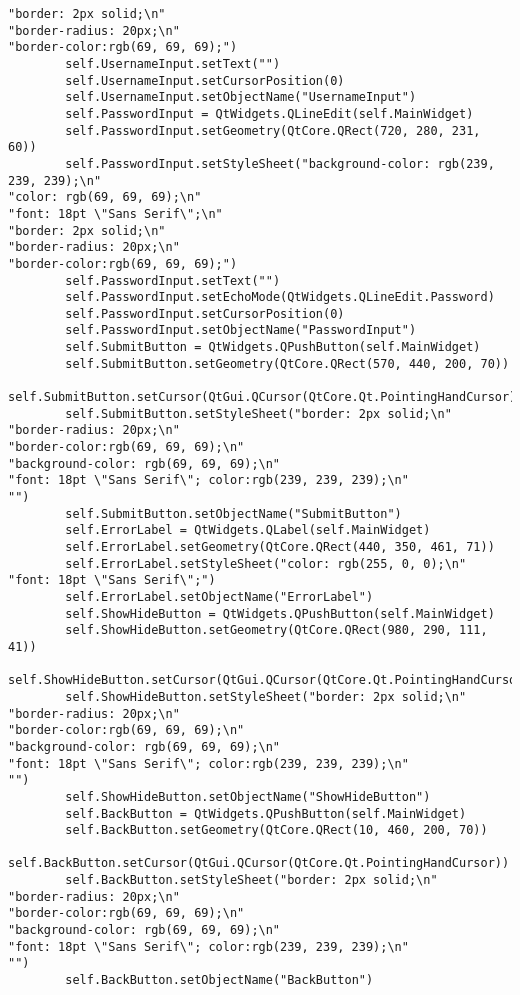\documentclass{article}
\begin{document}
\begin{lstlisting}
"border: 2px solid;\n"
"border-radius: 20px;\n"
"border-color:rgb(69, 69, 69);")
        self.UsernameInput.setText("")
        self.UsernameInput.setCursorPosition(0)
        self.UsernameInput.setObjectName("UsernameInput")
        self.PasswordInput = QtWidgets.QLineEdit(self.MainWidget)
        self.PasswordInput.setGeometry(QtCore.QRect(720, 280, 231, 60))
        self.PasswordInput.setStyleSheet("background-color: rgb(239, 239, 239);\n"
"color: rgb(69, 69, 69);\n"
"font: 18pt \"Sans Serif\";\n"
"border: 2px solid;\n"
"border-radius: 20px;\n"
"border-color:rgb(69, 69, 69);")
        self.PasswordInput.setText("")
        self.PasswordInput.setEchoMode(QtWidgets.QLineEdit.Password)
        self.PasswordInput.setCursorPosition(0)
        self.PasswordInput.setObjectName("PasswordInput")
        self.SubmitButton = QtWidgets.QPushButton(self.MainWidget)
        self.SubmitButton.setGeometry(QtCore.QRect(570, 440, 200, 70))
        self.SubmitButton.setCursor(QtGui.QCursor(QtCore.Qt.PointingHandCursor))
        self.SubmitButton.setStyleSheet("border: 2px solid;\n"
"border-radius: 20px;\n"
"border-color:rgb(69, 69, 69);\n"
"background-color: rgb(69, 69, 69);\n"
"font: 18pt \"Sans Serif\"; color:rgb(239, 239, 239);\n"
"")
        self.SubmitButton.setObjectName("SubmitButton")
        self.ErrorLabel = QtWidgets.QLabel(self.MainWidget)
        self.ErrorLabel.setGeometry(QtCore.QRect(440, 350, 461, 71))
        self.ErrorLabel.setStyleSheet("color: rgb(255, 0, 0);\n"
"font: 18pt \"Sans Serif\";")
        self.ErrorLabel.setObjectName("ErrorLabel")
        self.ShowHideButton = QtWidgets.QPushButton(self.MainWidget)
        self.ShowHideButton.setGeometry(QtCore.QRect(980, 290, 111, 41))
        self.ShowHideButton.setCursor(QtGui.QCursor(QtCore.Qt.PointingHandCursor))
        self.ShowHideButton.setStyleSheet("border: 2px solid;\n"
"border-radius: 20px;\n"
"border-color:rgb(69, 69, 69);\n"
"background-color: rgb(69, 69, 69);\n"
"font: 18pt \"Sans Serif\"; color:rgb(239, 239, 239);\n"
"")
        self.ShowHideButton.setObjectName("ShowHideButton")
        self.BackButton = QtWidgets.QPushButton(self.MainWidget)
        self.BackButton.setGeometry(QtCore.QRect(10, 460, 200, 70))
        self.BackButton.setCursor(QtGui.QCursor(QtCore.Qt.PointingHandCursor))
        self.BackButton.setStyleSheet("border: 2px solid;\n"
"border-radius: 20px;\n"
"border-color:rgb(69, 69, 69);\n"
"background-color: rgb(69, 69, 69);\n"
"font: 18pt \"Sans Serif\"; color:rgb(239, 239, 239);\n"
"")
        self.BackButton.setObjectName("BackButton")


\end{lstlisting}
\end{document}
